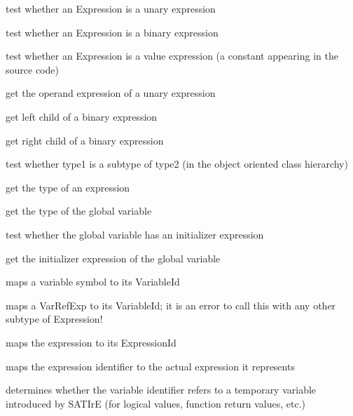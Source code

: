 \documentclass[a4paper,12pt]{report}
\begin{document}
\begin{description}
    test whether an Expression is a unary expression

    test whether an Expression is a binary expression

    test whether an Expression is a value expression (a constant appearing
    in the source code)

    get the operand expression of a unary expression

    get left child of a binary expression

    get right child of a binary expression

    test whether type1 is a subtype of type2 (in the object oriented class
    hierarchy)

    get the type of an expression

    get the type of the global variable

    test whether the global variable has an initializer expression

    get the initializer expression of the global variable

    maps a variable symbol to its VariableId

    maps a VarRefExp to its VariableId; it is an error to call this with any
    other subtype of Expression!

    maps the expression to its ExpressionId

    maps the expression identifier to the actual expression it represents

    determines whether the variable identifier refers to a temporary
    variable introduced by SATIrE (for logical values, function return
    values, etc.)


\end{description}
\end{document}
